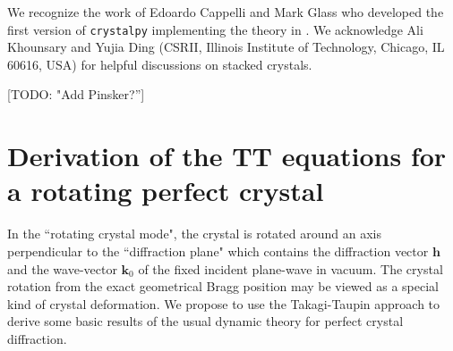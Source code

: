 \documentclass[preprint]{iucr}              %
\newcommand{\todo}[1]{{\color{red}[TODO: "#1'']}}
\begin{document}
We recognize the work of Edoardo Cappelli and Mark Glass who developed the first version of {\tt crystalpy} implementing the theory in \cite{ZachariasenBook}. We acknowledge Ali Khounsary and Yujia Ding (CSRII, Illinois Institute of Technology, Chicago, IL 60616, USA) for helpful discussions on stacked crystals. 

\todo{Add Pinsker?}


\appendix

\section{Derivation of the TT equations for a rotating perfect crystal}
\label{appendix:rotating}

In the ``rotating crystal mode", the crystal is rotated around an axis perpendicular to the ``diffraction plane" which contains the diffraction vector $\textbf{h}$ and the wave-vector $\textbf{k}_0$ of the fixed incident plane-wave in vacuum. The crystal rotation from the exact geometrical Bragg position may be viewed as a special kind of crystal deformation. We propose to use the Takagi-Taupin approach to derive some basic results of the usual dynamic theory for perfect crystal diffraction. 
\end{document}

